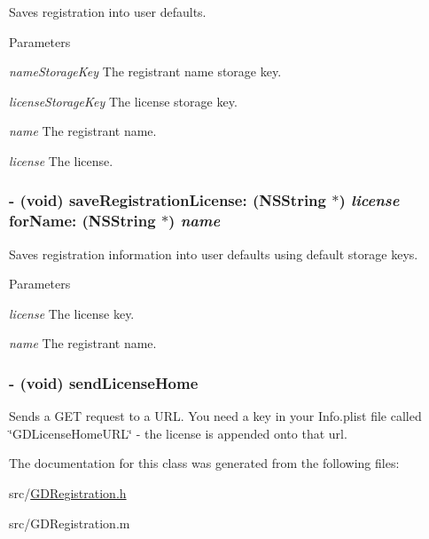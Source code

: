 Saves registration into user defaults. 
\begin{DoxyParams}{Parameters}
\item[{\em nameStorageKey}]The registrant name storage key. \item[{\em licenseStorageKey}]The license storage key. \item[{\em name}]The registrant name. \item[{\em license}]The license. \end{DoxyParams}
\hypertarget{interface_g_d_registration_a4ce808c5e052ea5080329c56b89df626}{
\subsubsection[{saveRegistrationLicense:forName:}]{\setlength{\rightskip}{0pt plus 5cm}-\/ (void) saveRegistrationLicense: (NSString $\ast$) {\em license}\/ forName: (NSString $\ast$) {\em name}}}
\label{interface_g_d_registration_a4ce808c5e052ea5080329c56b89df626}


Saves registration information into user defaults using default storage keys. 
\begin{DoxyParams}{Parameters}
\item[{\em license}]The license key. \item[{\em name}]The registrant name. \end{DoxyParams}
\hypertarget{interface_g_d_registration_a2aab3c30ff8931c4ce11159ecb3b830c}{
\subsubsection[{sendLicenseHome}]{\setlength{\rightskip}{0pt plus 5cm}-\/ (void) sendLicenseHome }}
\label{interface_g_d_registration_a2aab3c30ff8931c4ce11159ecb3b830c}


Sends a GET request to a URL. You need a key in your Info.plist file called \char`\"{}GDLicenseHomeURL\char`\"{} -\/ the license is appended onto that url. 

The documentation for this class was generated from the following files:\begin{DoxyCompactItemize}
\item 
src/\hyperlink{_g_d_registration_8h}{GDRegistration.h}\item 
src/GDRegistration.m\end{DoxyCompactItemize}
